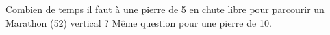 

\begin{exercice}\label{exo006}

Combien de temps il faut à une pierre de \unit{5}{\kilogram} en chute libre pour parcourir un Marathon (\unit{52}{\kilo\meter}) vertical ? Même question pour une pierre de \unit{10}{\kilo\gram}.

\end{exercice}
